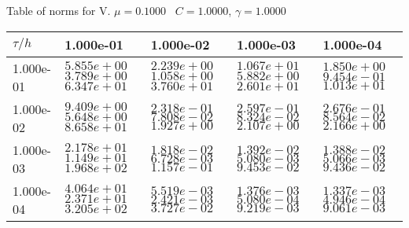 \begin{center}
Table of norms for V. $\mu = 0.1000$ \, $C = 1.0000$, $\gamma = 1.0000$
  
\begin{tabular}{|p{1in}|p{1in}|p{1in}|p{1in}|p{1in}|} \hline
$\tau / h$ &1.000e-01 &1.000e-02 &1.000e-03 &1.000e-04 \\ \hline 
1.000e-01 & $5.855e+00$  $3.789e+00$  $6.347e+01$  & $2.239e+00$  $1.058e+00$  $3.760e+01$  & $1.067e+01$  $5.882e+00$  $2.601e+01$  & $1.850e+00$  $9.454e-01$  $1.013e+01$  \\ \hline 
1.000e-02 & $9.409e+00$  $5.648e+00$  $8.658e+01$  & $2.318e-01$  $7.808e-02$  $1.927e+00$  & $2.597e-01$  $8.324e-02$  $2.107e+00$  & $2.676e-01$  $8.564e-02$  $2.166e+00$  \\ \hline 
1.000e-03 & $2.178e+01$  $1.149e+01$  $1.968e+02$  & $1.818e-02$  $6.728e-03$  $1.157e-01$  & $1.392e-02$  $5.080e-03$  $9.453e-02$  & $1.388e-02$  $5.066e-03$  $9.436e-02$  \\ \hline 
1.000e-04 & $4.064e+01$  $2.371e+01$  $3.205e+02$  & $5.519e-03$  $2.421e-03$  $3.727e-02$  & $1.376e-03$  $5.080e-04$  $9.219e-03$  & $1.337e-03$  $4.946e-04$  $9.061e-03$  \\ \hline 

\end{tabular}\\[20pt]
\end{center}
